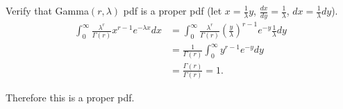 
Verify that Gamma$\left( r, \lambda \right)$ pdf is a proper pdf (let $x = \frac{1}{\lambda}y$, $\frac{dx}{dy} = \frac{1}{\lambda}$, $dx = \frac{1}{\lambda}dy$).
\begin{align*}
	\int_{0}^{\infty} \frac{\lambda^{r}}{\Gamma \left( r \right) }x ^{r - 1} e ^{-\lambda x } dx &= \int_{0}^{\infty} \frac{\lambda ^{r}}{\Gamma \left( r \right) } \left( \frac{y}{\lambda} \right) ^{r - 1} e ^{-y } \frac{1}{\lambda}dy  \\
												     &= \frac{1}{\Gamma \left( r \right) } \int_{0}^{\infty} y ^{r - 1} e ^{-y} dy   \\
												     &= \frac{\Gamma \left( r \right) }{\Gamma \left( r \right) } = 1
.\end{align*}

Therefore this is a proper pdf. 

